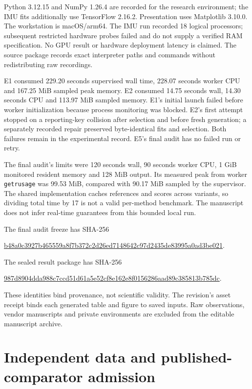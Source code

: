 \documentclass[11pt]{article}
\begin{document}
Python 3.12.15 and NumPy 1.26.4 are recorded for the research environment; the IMU fits additionally use TensorFlow 2.16.2. Presentation uses Matplotlib 3.10.0. The workstation is macOS/arm64. The IMU run recorded 18 logical processors; subsequent restricted hardware probes failed and do not supply a verified RAM specification. No GPU result or hardware deployment latency is claimed. The source package records exact interpreter paths and commands without redistributing raw recordings.

E1 consumed 229.20 seconds supervised wall time, 228.07 seconds worker CPU and 167.25 MiB sampled peak memory. E2 consumed 14.75 seconds wall, 14.30 seconds CPU and 113.97 MiB sampled memory. E1's initial launch failed before worker initialization because process monitoring was blocked. E2's first attempt stopped on a reporting-key collision after selection and before fresh generation; a separately recorded repair preserved byte-identical fits and selection. Both failures remain in the experimental record. E5's final audit has no failed run or retry.

The final audit's limits were 120 seconds wall, 90 seconds worker CPU, 1 GiB monitored resident memory and 128 MiB output. Its measured peak from worker \texttt{getrusage} was 99.53 MiB, compared with 90.17 MiB sampled by the supervisor. The shared implementation caches references and scores across variants, so dividing total time by 17 is not a valid per-method benchmark. The manuscript does not infer real-time guarantees from this bounded local run.

The final audit freeze has SHA-256
\begin{center}\small\url{b48a0c3927b465559a8f7b372c2d26ed7148642c97d2435de83995a0ad3be021}.\end{center}
The sealed result package has SHA-256
\begin{center}\small\url{987d8904dda988c7ccd51d61a5e52cf8e162e8f0156286aad89c385813b785dc}.\end{center}
These identities bind provenance, not scientific validity. The revision's asset receipt binds each generated table and figure to saved inputs. Raw observations, vendor manuscripts and private environments are excluded from the editable manuscript archive.

\section{Independent data and published-comparator admission}
\end{document}
